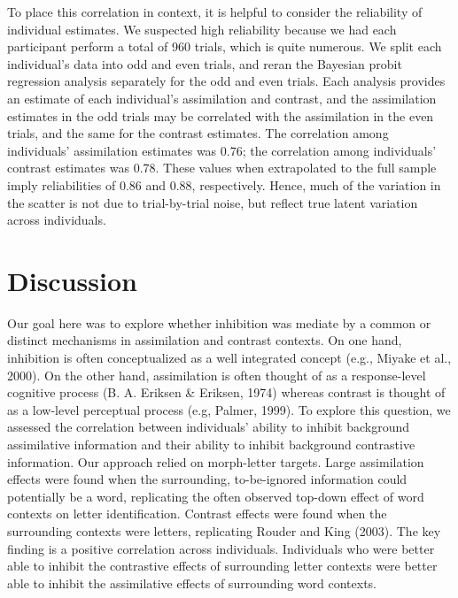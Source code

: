 \documentclass[english,floatsintext,man]{apa6}
\begin{document}
To place this correlation in context, it is helpful to consider the
reliability of individual estimates. We suspected high reliability
because we had each participant perform a total of 960 trials, which is
quite numerous. We split each individual's data into odd and even
trials, and reran the Bayesian probit regression analysis separately for
the odd and even trials. Each analysis provides an estimate of each
individual's assimilation and contrast, and the assimilation estimates
in the odd trials may be correlated with the assimilation in the even
trials, and the same for the contrast estimates. The correlation among
individuals' assimilation estimates was 0.76; the correlation among
individuals' contrast estimates was 0.78. These values when extrapolated
to the full sample imply reliabilities of 0.86 and 0.88, respectively.
Hence, much of the variation in the scatter is not due to trial-by-trial
noise, but reflect true latent variation across individuals.

\section{Discussion}\label{discussion}

Our goal here was to explore whether inhibition was mediate by a common
or distinct mechanisms in assimilation and contrast contexts. On one
hand, inhibition is often conceptualized as a well integrated concept
(e.g., Miyake et al., 2000). On the other hand, assimilation is often
thought of as a response-level cognitive process (B. A. Eriksen \&
Eriksen, 1974) whereas contrast is thought of as a low-level perceptual
process (e.g, Palmer, 1999). To explore this question, we assessed the
correlation between individuals' ability to inhibit background
assimilative information and their ability to inhibit background
contrastive information. Our approach relied on morph-letter targets.
Large assimilation effects were found when the surrounding,
to-be-ignored information could potentially be a word, replicating the
often observed top-down effect of word contexts on letter
identification. Contrast effects were found when the surrounding
contexts were letters, replicating Rouder and King (2003). The key
finding is a positive correlation across individuals. Individuals who
were better able to inhibit the contrastive effects of surrounding
letter contexts were better able to inhibit the assimilative effects of
surrounding word contexts.
\end{document}
